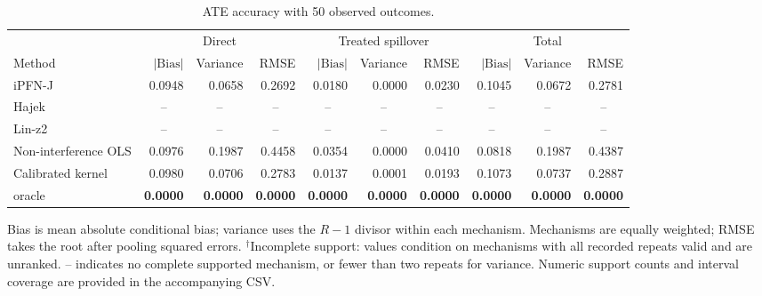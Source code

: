 \begin{table}[tb]
\centering
\caption{ATE accuracy with 50 observed outcomes.}
\begingroup\footnotesize
\setlength{\tabcolsep}{3pt}
\begin{tabular*}{\linewidth}{@{\extracolsep{\fill}}l*{9}{r}@{}}
\toprule
&\multicolumn{3}{c}{Direct}&\multicolumn{3}{c}{Treated spillover}&\multicolumn{3}{c}{Total}\\
\cmidrule(lr){2-4}\cmidrule(lr){5-7}\cmidrule(lr){8-10}
Method&$|\mathrm{Bias}|$&Variance&RMSE&$|\mathrm{Bias}|$&Variance&RMSE&$|\mathrm{Bias}|$&Variance&RMSE\\
\midrule
iPFN-J & \cellcolor{blue!17}0.0948 & \cellcolor{blue!17}0.0658 & \cellcolor{blue!17}0.2692 & \cellcolor{blue!11}0.0180 & \cellcolor{blue!11}0.0000 & \cellcolor{blue!11}0.0230 & \cellcolor{blue!11}0.1045 & \cellcolor{blue!17}0.0672 & \cellcolor{blue!17}0.2781 \\
Hajek & \multicolumn{1}{c}{--} & \multicolumn{1}{c}{--} & \multicolumn{1}{c}{--} & \multicolumn{1}{c}{--} & \multicolumn{1}{c}{--} & \multicolumn{1}{c}{--} & \multicolumn{1}{c}{--} & \multicolumn{1}{c}{--} & \multicolumn{1}{c}{--} \\
Lin-z2 & \multicolumn{1}{c}{--} & \multicolumn{1}{c}{--} & \multicolumn{1}{c}{--} & \multicolumn{1}{c}{--} & \multicolumn{1}{c}{--} & \multicolumn{1}{c}{--} & \multicolumn{1}{c}{--} & \multicolumn{1}{c}{--} & \multicolumn{1}{c}{--} \\
Non-interference OLS & \cellcolor{blue!11}0.0976 & \cellcolor{blue!7}0.1987 & \cellcolor{blue!7}0.4458 & \cellcolor{blue!7}0.0354 & \cellcolor{blue!17}0.0000 & \cellcolor{blue!7}0.0410 & \cellcolor{blue!17}0.0818 & \cellcolor{blue!7}0.1987 & \cellcolor{blue!7}0.4387 \\
Calibrated kernel & \cellcolor{blue!7}0.0980 & \cellcolor{blue!11}0.0706 & \cellcolor{blue!11}0.2783 & \cellcolor{blue!17}0.0137 & \cellcolor{blue!7}0.0001 & \cellcolor{blue!17}0.0193 & \cellcolor{blue!7}0.1073 & \cellcolor{blue!11}0.0737 & \cellcolor{blue!11}0.2887 \\
oracle & \cellcolor{blue!24}\textbf{0.0000} & \cellcolor{blue!24}\textbf{0.0000} & \cellcolor{blue!24}\textbf{0.0000} & \cellcolor{blue!24}\textbf{0.0000} & \cellcolor{blue!24}\textbf{0.0000} & \cellcolor{blue!24}\textbf{0.0000} & \cellcolor{blue!24}\textbf{0.0000} & \cellcolor{blue!24}\textbf{0.0000} & \cellcolor{blue!24}\textbf{0.0000} \\
\bottomrule
\end{tabular*}\endgroup
\vspace{3pt}
\begin{minipage}{\linewidth}\scriptsize
Bias is mean absolute conditional bias; variance uses the $R-1$ divisor within each mechanism.
Mechanisms are equally weighted; RMSE takes the root after pooling squared errors.
$^{\dagger}$Incomplete support: values condition on mechanisms with all recorded repeats valid and are unranked.
-- indicates no complete supported mechanism, or fewer than two repeats for variance.
Numeric support counts and interval coverage are provided in the accompanying CSV.
\end{minipage}
\end{table}

